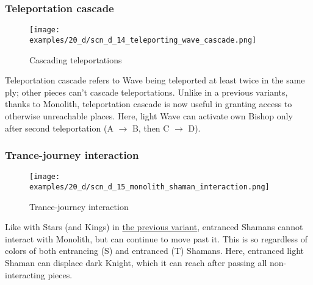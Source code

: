 \clearpage %

\subsubsection*{Teleportation cascade}

\vspace*{-0.9\baselineskip}
\noindent
\begin{figure}[!h]
\texttt{[image: examples/20\_d/scn\_d\_14\_teleporting\_wave\_cascade.png]}
\caption{Cascading teleportations}
\label{fig:scn_d_14_teleporting_wave_cascade}
\end{figure}

Teleportation cascade refers to Wave being teleported at least twice in the same ply;
other pieces can't cascade teleportations. Unlike in a previous variants, thanks to
Monolith, teleportation cascade is now useful in granting access to otherwise unreachable
places. Here, light Wave can activate own Bishop only after second teleportation
(A $\rightarrow$ B, then C $\rightarrow$ D).

\clearpage %

\subsubsection*{Trance-journey interaction}

\vspace*{-0.9\baselineskip}
\noindent
\begin{figure}[!h]
\texttt{[image: examples/20\_d/scn\_d\_15\_monolith\_shaman\_interaction.png]}
\caption{Trance-journey interaction}
\label{fig:scn_d_15_monolith_shaman_interaction}
\end{figure}

Like with Stars (and Kings) in \hyperref[fig:scn_cot_18_light_light_shaman_interaction_start]{the previous variant},
entranced Shamans cannot interact with Monolith, but can continue to move past it. This is so regardless of colors
of both entrancing (S) and entranced (T) Shamans. Here, entranced light Shaman can displace dark Knight, which it
can reach after passing all non-interacting pieces.


